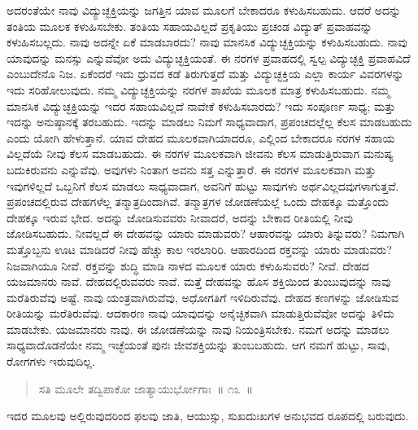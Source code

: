 ಅದರಂತೆಯೇ ನಾವು ವಿದ್ಯುಚ್ಛಕ್ತಿಯನ್ನು ಜಗತ್ತಿನ ಯಾವ ಮೂಲಗೆ ಬೇಕಾದರೂ ಕಳುಹಿಸಬಹುದು. ಆದರೆ ಅದನ್ನು ತಂತಿಯ ಮೂಲಕ ಕಳುಹಿಸಬೇಕು. ತಂತಿಯ ಸಹಾಯವಿಲ್ಲದೆ ಪ್ರಕೃತಿಯು ಪ್ರಚಂಡ ವಿದ್ಯುತ್​ ಪ್ರವಾಹವನ್ನು ಕಳುಹಿಸಬಲ್ಲದು. ನಾವು ಅದನ್ನೇ ಏಕೆ ಮಾಡಬಾರದು? ನಾವು ಮಾನಸಿಕ ವಿದ್ಯುಚ್ಛಕ್ತಿಯನ್ನು ಕಳುಹಿಸಬಹುದು. ನಾವು ಯಾವುದನ್ನು ಮನಸ್ಸು ಎನ್ನುವೆವೋ ಅದು ವಿದ್ಯುಚ್ಛಕ್ತಿಯಂತೆ. ಈ ನರಗಳ ಪ್ರವಾಹದಲ್ಲಿ ಸ್ವಲ್ಪ ವಿದ್ಯುಚ್ಛಕ್ತಿ ಪ್ರವಾಹವಿದೆ ಎಂಬುದೇನೊ ನಿಜ. ಏಕೆಂದರೆ ಇದು ಧ್ರುವದ ಕಡೆ ತಿರುಗುತ್ತದೆ ಮತ್ತು ವಿದ್ಯುಚ್ಛಕ್ತಿಯ ಎಲ್ಲಾ ಕಾರ್ಯ ವಿವರಗಳನ್ನು ಇದು ಸರಿಹೋಲುವುದು. ನಮ್ಮ ವಿದ್ಯುಚ್ಛಕ್ತಿಯನ್ನು ನರಗಳ ಶಾಖೆಯ ಮೂಲಕ ಮಾತ್ರ ಕಳುಹಿಸಬಹುದು. ನಮ್ಮ ಮಾನಸಿಕ ವಿದ್ಯುಚ್ಛಕ್ತಿಯನ್ನು ಇದರ ಸಹಾಯವಿಲ್ಲದೆ ನಾವೇಕೆ ಕಳುಹಿಸಬಾರದು? ಇದು ಸಂಪೂರ್ಣ ಸಾಧ್ಯ; ಮತ್ತು ಇದನ್ನು ಅನುಷ್ಠಾನಕ್ಕೆ ತರಬಹುದು. ಇದನ್ನು ಮಾಡಲು ನಿಮಗೆ ಸಾಧ್ಯವಾದಾಗ, ಪ್ರಪಂಚದಲ್ಲೆಲ್ಲ ಕೆಲಸ ಮಾಡಬಹುದು ಎಂದು ಯೋಗಿ ಹೇಳುತ್ತಾನೆ. ಯಾವ ದೇಹದ ಮೂಲಕವಾಗಿಯಾದರೂ, ಎಲ್ಲಿಂದ ಬೇಕಾದರೂ ನರಗಳ ಸಹಾಯ ವಿಲ್ಲದೆಯೆ ನೀವು ಕೆಲಸ ಮಾಡಬಹುದು. ಈ ನರಗಳ ಮೂಲಕವಾಗಿ ಜೀವನು ಕೆಲಸ ಮಾಡುತ್ತಿರುವಾಗ ಮನುಷ್ಯ ಬದುಕಿರುವನು ಎನ್ನುವೆವು. ಅವುಗಳು ನಿಂತಾಗ ಅವನು ಸತ್ತ ಎನ್ನುತ್ತಾರೆ. ಈ ನರಗಳ ಮೂಲಕವಾಗಿ ಮತ್ತು ಇವುಗಳಿಲ್ಲದೆ ಒಬ್ಬನಿಗೆ ಕೆಲಸ ಮಾಡಲು ಸಾಧ್ಯವಾದಾಗ, ಅವನಿಗೆ ಹುಟ್ಟು ಸಾವುಗಳು ಅರ್ಥವಿಲ್ಲದವುಗಳಾಗುತ್ತವೆ. ಪ್ರಪಂಚದಲ್ಲಿರುವ ದೇಹಗಳೆಲ್ಲ ತನ್ಮಾತ್ರದಿಂದಾಗಿವೆ. ತನ್ಮಾತ್ರಗಳ ಜೋಡಣೆಯಲ್ಲೆ ಒಂದು ದೇಹಕ್ಕೂ ಮತ್ತೊಂದು ದೇಹಕ್ಕೂ ಇರುವ ಭೇದ. ಅದನ್ನು ಜೋಡಿಸುವವರು ನೀವಾದರೆ, ಅದನ್ನು ಬೇಕಾದ ರೀತಿಯಲ್ಲಿ ನೀವು ಜೋಡಿಸಬಹುದು. ನೀವಲ್ಲದೆ ಈ ದೇಹವನ್ನು ಯಾರು ಮಾಡುವರು? ಆಹಾರವನ್ನು ಯಾರು ತಿನ್ನುವರು? ನಿಮಗಾಗಿ ಮತ್ತೊಬ್ಬನು ಊಟ ಮಾಡಿದರೆ ನೀವು ಹೆಚ್ಚು ಕಾಲ ಇರಲಾರಿರಿ. ಆಹಾರದಿಂದ ರಕ್ತವನ್ನು ಯಾರು ಮಾಡುವರು? ನಿಜವಾಗಿಯೂ ನೀವೆ. ರಕ್ತವನ್ನು ಶುದ್ಧಿ ಮಾಡಿ ನಾಳದ ಮೂಲಕ ಯಾರು ಕಳುಹಿಸುವರು? ನೀವೆ. ದೇಹದ ಯಜಮಾನರು ನಾವೆ. ದೇಹದಲ್ಲಿರುವವರು ನಾವೆ. ಮತ್ತೆ ದೇಹವನ್ನು ಹೊಸ ಶಕ್ತಿಯಿಂದ ತುಂಬುವುದನ್ನು ನಾವು ಮರೆತಿರುವೆವು ಅಷ್ಟೆ. ನಾವು ಯಂತ್ರವಾಗಿರುವೆವು, ಅಧೋಗತಿಗೆ ಇಳಿದಿರುವೆವು. ದೇಹದ ಕಣಗಳನ್ನು ಜೋಡಿಸುವ ರೀತಿಯನ್ನು ಮರೆತಿರುವೆವು. ಆದಕಾರಣ ನಾವು ಯಾವುದನ್ನು ಅನೈಚ್ಛಿಕವಾಗಿ ಮಾಡುತ್ತಿರುವೆವೋ ಅದನ್ನು ತಿಳಿದು ಮಾಡಬೇಕು. ಯಜಮಾನರು ನಾವು. ಈ ಜೋಡಣೆಯನ್ನು ನಾವು ನಿಯಂತ್ರಿಸಬೇಕು. ನಮಗೆ ಅದನ್ನು ಮಾಡಲು ಸಾಧ್ಯವಾದೊಡನೆಯೇ ನಮ್ಮ ಇಚ್ಛೆಯಂತೆ ಪುನಃ ಜೀವಶಕ್ತಿಯನ್ನು ತುಂಬಬಹುದು. ಆಗ ನಮಗೆ ಹುಟ್ಟು, ಸಾವು, ರೋಗಗಳು ಇರುವುದಿಲ್ಲ. 

\vspace{-0.3cm}

\begin{verse}
ಸತಿ ಮೂಲೇ ತದ್ವಿಪಾಕೋ ಜಾತ್ಯಾಯುರ್ಭೋಗಾಃ~॥ ೧೩~॥
\end{verse}

\vspace{-0.3cm}

ಇದರ ಮೂಲವು ಅಲ್ಲಿರುವುದರಿಂದ ಫಲವು ಜಾತಿ, ಆಯುಸ್ಸು, ಸುಖದುಃಖಗಳ ಅನುಭವದ ರೂಪದಲ್ಲಿ ಬರುವುದು. 


